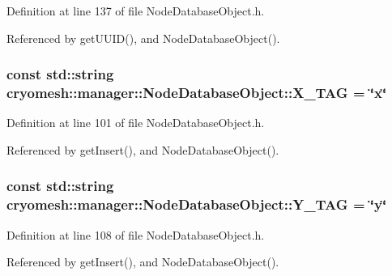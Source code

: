 \-Definition at line 137 of file \-Node\-Database\-Object.\-h.



\-Referenced by get\-U\-U\-I\-D(), and \-Node\-Database\-Object().

\hypertarget{classcryomesh_1_1manager_1_1NodeDatabaseObject_a13b5bc3d98b96aaf13946d894ee198da}{
\subsubsection[{\-X\-\_\-\-T\-A\-G}]{\setlength{\rightskip}{0pt plus 5cm}const std\-::string {\bf cryomesh\-::manager\-::\-Node\-Database\-Object\-::\-X\-\_\-\-T\-A\-G} = \char`\"{}x\char`\"{}}}\label{classcryomesh_1_1manager_1_1NodeDatabaseObject_a13b5bc3d98b96aaf13946d894ee198da}


\-Definition at line 101 of file \-Node\-Database\-Object.\-h.



\-Referenced by get\-Insert(), and \-Node\-Database\-Object().

\hypertarget{classcryomesh_1_1manager_1_1NodeDatabaseObject_a53f9eddc7a4946d85d3c2a873b501fb4}{
\subsubsection[{\-Y\-\_\-\-T\-A\-G}]{\setlength{\rightskip}{0pt plus 5cm}const std\-::string {\bf cryomesh\-::manager\-::\-Node\-Database\-Object\-::\-Y\-\_\-\-T\-A\-G} = \char`\"{}y\char`\"{}}}\label{classcryomesh_1_1manager_1_1NodeDatabaseObject_a53f9eddc7a4946d85d3c2a873b501fb4}


\-Definition at line 108 of file \-Node\-Database\-Object.\-h.



\-Referenced by get\-Insert(), and \-Node\-Database\-Object().

